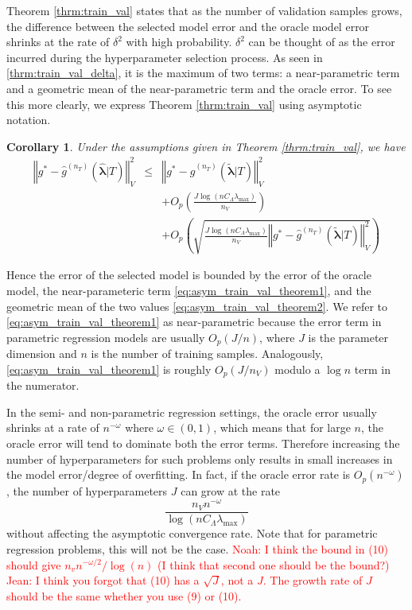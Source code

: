\documentclass[12pt]{article}
\newtheorem{corollary}{Corollary}
\begin{document}
Theorem \ref{thrm:train_val} states that as the number of validation samples grows, the difference between the selected model error and the oracle model error shrinks at the rate of $\delta^2$ with high probability. $\delta^2$ can be thought of as the error incurred during the hyperparameter selection process. As seen in \eqref{thrm:train_val_delta}, it is the maximum of two terms: a near-parametric term and a geometric mean of the near-parametric term and the oracle error. To see this more clearly, we express Theorem \ref{thrm:train_val} using asymptotic notation.
\begin{corollary}
	\label{corr:train_val}
	Under the assumptions given in Theorem \ref{thrm:train_val}, we have
	\begin{eqnarray}
	\left\Vert g^* - \hat{g}^{(n_T)}( \hat{\boldsymbol{\lambda}} | T) \right\Vert _{V}^2 &\le& \left\Vert g^* - \hat{g}^{(n_T)}( \tilde{\boldsymbol{\lambda}} | T) \right \Vert^2_{V}\\
	&& + O_p \left(\frac{J\log (n C_\Lambda\lambda_{\max})}{n_{V}} \right) 
	\label{eq:asym_train_val_theorem1} \\
	&& + O_p \left(
	\sqrt{
		\frac{J \log (n C_\Lambda\lambda_{\max})}{n_{V}}
		\left\Vert g^* - \hat{g}^{(n_T)}( \tilde{\boldsymbol{\lambda}}| T) \right \Vert^2_{V}
	}
	\right )
	\label{eq:asym_train_val_theorem2}
	\end{eqnarray}
\end{corollary}
Hence the error of the selected model is bounded by the error of the oracle model, the near-parameteric term \eqref{eq:asym_train_val_theorem1}, and the geometric mean of the two values \eqref{eq:asym_train_val_theorem2}. We refer to \eqref{eq:asym_train_val_theorem1} as near-parametric because the error term in parametric regression models are usually $O_p(J/n)$, where $J$ is the parameter dimension and $n$ is the number of training samples. Analogously, \eqref{eq:asym_train_val_theorem1} is roughly $O_p(J/n_V)$ modulo a $\log n$ term in the numerator.

In the semi- and non-parametric regression settings, the oracle error usually shrinks at a rate of $n^{-\omega}$ where $\omega \in (0, 1)$, which means that for large $n$, the oracle error will tend to dominate both the error terms. Therefore increasing the number of hyperparameters for such problems only results in small increases in the model error/degree of overfitting. In fact, if the oracle error rate is $O_p(n^{-\omega})$, the number of hyperparameters $J$ can grow at the rate
\begin{equation}
\frac{n_{V} n^{-\omega}}{\log (n C_\Lambda\lambda_{\max})}
\end{equation}
without affecting the asymptotic convergence rate. Note that for parametric regression problems, this will not be the case. \textcolor{red}{Noah: I think the bound in (10) should give $n_vn^{-\omega/2}/\operatorname{log}(n)$ (I think that second one should be the bound?) Jean: I think you forgot that (10) has a $\sqrt{J}$, not a $J$. The growth rate of $J$ should be the same whether you use (9) or (10).}
\end{document}
